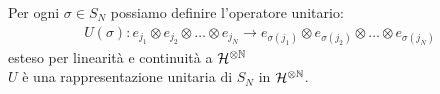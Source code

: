 \documentclass[../../FisicaTeorica.tex]{subfiles}
\begin{document}
Per ogni $\sigma\in S_N$ possiamo definire l'operatore unitario:
\begin{align*}
U(\sigma): e_{j_1}\otimes e_{j_2}\otimes \dots \otimes e_{j_N} \to e_{\sigma(j_1)} \otimes e_{\sigma(j_2)} \otimes \dots \otimes e_{\sigma(j_N)}
\end{align*}
esteso per linearità e continuità a $\mathcal{H}^{\otimes \mathbb{N}}$ \\
$U$ è una rappresentazione unitaria di $S_N$ in $\mathcal{H}^{\otimes \mathbb{N}}$.
\end{document}
